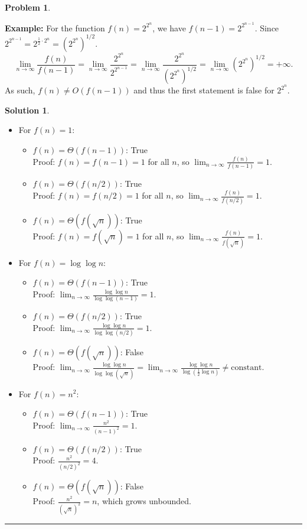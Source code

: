 \documentclass{article}
\theoremstyle{definition}
\newtheorem{problem}{Problem}
\def\fline{\rule{0.75\linewidth}{0.5pt}}
\newcommand{\finishline}{\begin{center}\fline\end{center}}
\newtheorem*{solution*}{Solution}
\newenvironment{solution}{\begin{solution*}}{{\finishline} \end{solution*}}
\begin{document}
\begin{problem}
\begin{enumerate}
    \smallskip
	\textbf{Example:} For the function $f(n) = 2^{2^n}$, we have $f(n-1) = 2^{2^{n-1}}$.  Since $2^{2^{n-1}}= 2^{\frac{1}{2} \cdot 2^n} = (2^{2^{n}})^{1/2}$.
	\[
		\lim_{n \to \infty}\frac{f(n)}{f(n-1)} = \lim_{n \to \infty}\frac{2^{2^{n}}}{2^{2^{n-1}}} = \lim_{n \to \infty}\frac{2^{2^{n}}}{(2^{2^{n}})^{1/2}} = \lim_{n \to \infty}(2^{2^{n}})^{1/2} = +\infty.
	\]	
	As such, $f(n) \neq O(f(n-1))$ and thus the first statement is false for $2^{2^n}$.

  
    
    \begin{solution}
	\begin{itemize}
		\item For $f(n) = 1$: 
		\begin{itemize}
		    \item $f(n) = \Theta(f(n-1))$: True \\
		    Proof: $f(n) = f(n - 1) = 1$ for all $n$, so $\lim_{n \to \infty} \frac{f(n)}{f(n-1)} = 1$.
		    \item $f(n) = \Theta(f(n/2))$: True \\
		    Proof: $f(n) = f(n/2) = 1$ for all $n$, so $\lim_{n \to \infty} \frac{f(n)}{f(n/2)} = 1$.
		    \item $f(n) = \Theta(f(\sqrt{n}))$: True \\
		    Proof: $f(n) = f(\sqrt{n}) = 1$ for all $n$, so $\lim_{n \to \infty} \frac{f(n)}{f(\sqrt{n})} = 1$.
		\end{itemize}
	    
		\item For $f(n) = \log \log n$: 
		\begin{itemize}
		    \item $f(n) = \Theta(f(n-1))$: True \\
		    Proof: $\lim_{n \to \infty} \frac{\log \log n}{\log \log (n-1)} = 1$.
		    \item $f(n) = \Theta(f(n/2))$: True \\
		    Proof: $\lim_{n \to \infty} \frac{\log \log n}{\log \log (n/2)} = 1$.
		    \item $f(n) = \Theta(f(\sqrt{n}))$: False \\
		    Proof: $\lim_{n \to \infty} \frac{\log \log n}{\log \log (\sqrt{n})} = \lim_{n \to \infty} \frac{\log \log n}{\log (\frac{1}{2} \log n)} \neq \text{constant}$.
		\end{itemize}
	    
		\item For $f(n) = n^2$: 
		\begin{itemize}
		    \item $f(n) = \Theta(f(n-1))$: True \\
		    Proof: $\lim_{n \to \infty} \frac{n^2}{(n-1)^2} = 1$.
		    \item $f(n) = \Theta(f(n/2))$: True \\
		    Proof: $\frac{n^2}{(n/2)^2} = 4$.
		    \item $f(n) = \Theta(f(\sqrt{n}))$: False \\
		    Proof: $\frac{n^2}{(\sqrt{n})^2} = n$, which grows unbounded.
		\end{itemize}
	    

\end{itemize}
\end{solution}
\end{enumerate}
\end{problem}
\end{document}
